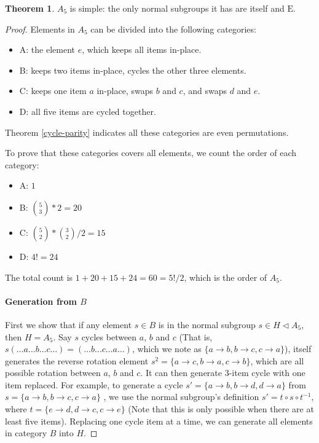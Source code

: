 \documentclass[]{article}
\theoremstyle{definition}\newtheorem{theorem}{Theorem}
\begin{document}
\begin{theorem}
	$A_5$ is simple: the only normal subgroups it has are itself and $\mathrm{E}$.
\end{theorem}
\begin{proof}
	Elements in $A_5$ can be divided into the following categories:
	\begin{itemize}
	\item A: the element $e$, which keeps all items in-place.
	\item B: keeps two items in-place, cycles the other three elements.
	\item C: keeps one item $a$ in-place, swaps $b$ and $c$, and swaps $d$ and $e$.
	\item D: all five items are cycled together.
	\end{itemize}
Theorem \ref{cycle-parity} indicates all these categories are even permutations.

To prove that these categories covers all elements, we count the order of each category:
	\begin{itemize}
		\item A: $1$
		\item B:  ${5 \choose 3} * 2 = 20$ 
		\item C: ${5 \choose 2} * {3 \choose 2} / 2 = 15$
		\item D: $4! = 24$
	\end{itemize}
The total count is $1 + 20 + 15 + 24 = 60 = 5! / 2$, which is the order of $A_5$.


\paragraph{Generation from $B$}First we show that if any element $s\in B$ is in the normal subgroup $s\in H \triangleleft A_5$, then $H = A_5$. Say $s$ cycles between $a$, $b$ and $c$ (That is, $s(\dots a \dots b \dots c \dots) = (\dots b \dots c \dots a \dots)$, which we note as $\{a\rightarrow b, b \rightarrow c, c\rightarrow a\}$), itself generates the reverse rotation element $s^2 = \{a\rightarrow c, b \rightarrow a, c\rightarrow b\}$, which are all possible rotation between $a$, $b$ and $c$. It can then generate 3-item cycle with one item replaced. For example, to generate a cycle $s' = \{a\rightarrow b, b \rightarrow d, d\rightarrow a\}$  from $s = \{a\rightarrow b, b \rightarrow c, c\rightarrow a\}$ , we use the normal subgroup's definition $s'=t\circ s\circ t^{-1}$, where $t = \{e\rightarrow d, d\rightarrow c, c\rightarrow e\}$ (Note that this is only possible when there are at least five items). Replacing one cycle item at a time, we can generate all elements in category $B$ into $H$. 


\end{proof}
\end{document}
